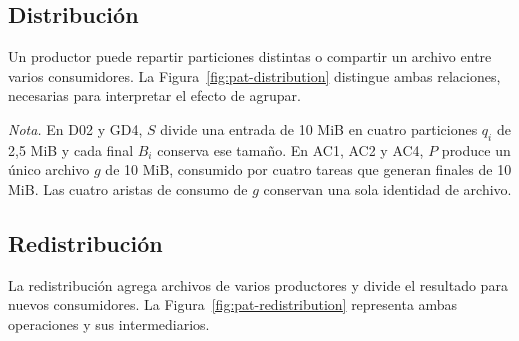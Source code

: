 \subsection{Distribución}
Un productor puede repartir particiones distintas o compartir un archivo entre varios consumidores. La Figura~\ref{fig:pat-distribution} distingue ambas relaciones, necesarias para interpretar el efecto de agrupar.

\par\medskip\noindent\begin{minipage}{\linewidth}
\captionsetup{type=figure}
\caption{Patrón de distribución: particiones distintas y archivo compartido}
\label{fig:pat-distribution}
\centering
\begin{lrbox}{\dmediagrambox}\end{lrbox}\fitdmediagram
\par\smallskip\raggedright\normalsize\textit{Nota.} En D02 y GD4, $S$ divide una entrada de 10 MiB en cuatro particiones $q_i$ de 2,5 MiB y cada final $B_i$ conserva ese tamaño. En AC1, AC2 y AC4, $P$ produce un único archivo $g$ de 10 MiB, consumido por cuatro tareas que generan finales de 10 MiB. Las cuatro aristas de consumo de $g$ conservan una sola identidad de archivo.
\end{minipage}\par\medskip

\subsection{Redistribución}
La redistribución agrega archivos de varios productores y divide el resultado para nuevos consumidores. La Figura~\ref{fig:pat-redistribution} representa ambas operaciones y sus intermediarios.

